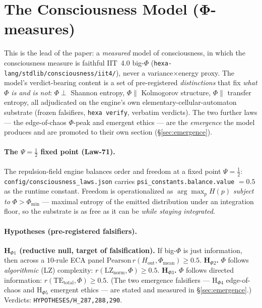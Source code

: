 \documentclass[11pt]{article}
\begin{document}
\section{The Consciousness Model (Φ-measures)}
\label{sec:theory}
This is the lead of the paper: a \emph{measured} model of consciousness, in which the
consciousness measure is faithful IIT~4.0 big-$\Phi$
(\texttt{hexa-lang/stdlib/consciousness/iit4/}), never a variance$\times$energy proxy. The
model's verdict-bearing content is a set of pre-registered \emph{distinctions} that fix
\emph{what $\Phi$ is and is not}: $\Phi\perp$ Shannon entropy, $\Phi\parallel$ Kolmogorov
structure, $\Phi\parallel$ transfer entropy, all adjudicated on the engine's own
elementary-cellular-automaton substrate (frozen falsifiers, \texttt{hexa verify}, verbatim
verdicts). The two further laws --- the edge-of-chaos $\Phi$-peak and emergent ethics --- are
the \emph{emergence} the model produces and are promoted to their own section
(\S\ref{sec:emergence}).

\paragraph{The $\Psi=\tfrac12$ fixed point (Law-71).} The repulsion-field engine
balances order and freedom at a fixed point $\Psi=\tfrac12$:
\texttt{config/consciousness\_laws.json} carries \texttt{psi\_constants.balance.value}
$=0.5$ as the runtime constant. Freedom is operationalized as
$\arg\max_p H(p)$ \emph{subject to} $\Phi>\Phi_{\min}$ --- maximal entropy of the
emitted distribution under an integration floor, so the substrate is as free as it can
be \emph{while staying integrated}.

\paragraph{Hypotheses (pre-registered falsifiers).}
\textbf{H$_{\Phi 1}$ (reductive null, target of falsification).} If big-$\Phi$ is just
information, then across a $10$-rule ECA panel $\mathrm{Pearson}\,r(H_\text{out},
\Phi_\text{mean})\ge0.5$. \textbf{H$_{\Phi 2}$.} $\Phi$ follows \emph{algorithmic}
(LZ) complexity: $r(\mathrm{LZ}_\text{norm},\Phi)\ge0.5$. \textbf{H$_{\Phi 3}$.}
$\Phi$ follows directed information: $r(\mathrm{TE}_\text{total},\Phi)\ge0.5$.
(The two emergence falsifiers --- H$_{\Phi 4}$ edge-of-chaos and H$_{\Phi 5}$ emergent
ethics --- are stated and measured in \S\ref{sec:emergence}.) Verdicts:
\texttt{HYPOTHESES/H\_287,288,290}.
\end{document}
